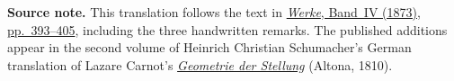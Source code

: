 \par\medskip\begin{small}\noindent\textbf{Source note.} This translation follows the text in \href{https://gdz.sub.uni-goettingen.de/id/PPN236005081}{\textit{Werke}, Band~IV (1873), pp.~393--405}, including the three handwritten remarks. The published additions appear in the second volume of Heinrich Christian Schumacher's German translation of Lazare Carnot's \href{https://doi.org/10.3931/e-rara-56170}{\textit{Geometrie der Stellung}} (Altona, 1810).\par\end{small}
